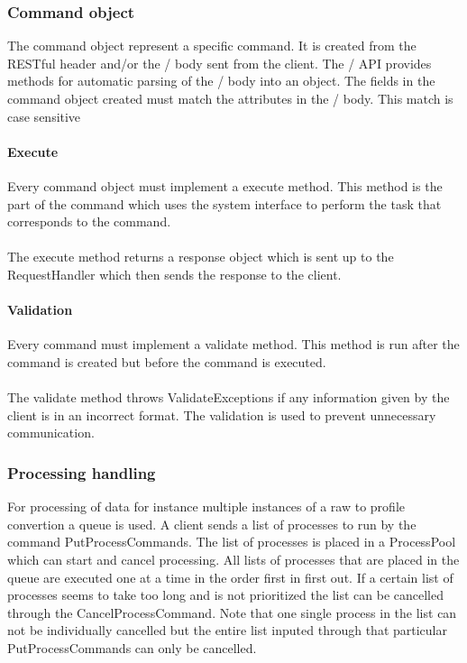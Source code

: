 \subsubsection{Command object}
The command object represent a specific command. It is created from the RESTful header and/or the \json/ body sent from the client. The \json/ API provides methods for automatic parsing of the \json/ body into an object. The fields in the command object created must match the attributes in the \json/ body. This match is case sensitive
\paragraph{Execute}
Every command object must implement a execute method. This method is the part of the command which uses the system interface to perform the task that corresponds to the command.\\
\\
The execute method returns a response object which is sent up to the RequestHandler which then sends the response to the client. 
\paragraph{Validation}
Every command must implement a validate method. This method is run after the command is created but before the command is executed.\\
\\
The validate method throws ValidateExceptions if any information given by the client is in an incorrect format. The validation is used to prevent unnecessary communication.
\subsubsection{Processing handling}
For processing of data for instance multiple instances of a raw to profile convertion a queue is used. A client sends a list of processes to run by the command PutProcessCommands. The list of processes is placed in a ProcessPool which can start and cancel processing. All lists of processes that are placed in the queue are executed one at a time in the order first in first out. If a certain list of processes seems to take too long and is not prioritized the list can be cancelled through the CancelProcessCommand. Note that one single process in the list can not be individually cancelled but the entire list inputed through that particular PutProcessCommands can only be cancelled.\\
\\ 
